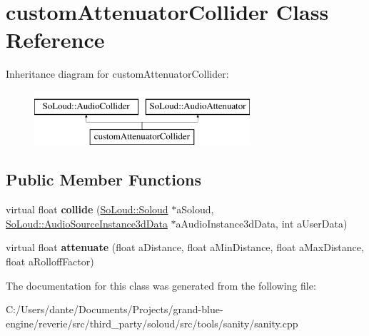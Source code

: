 \hypertarget{classcustom_attenuator_collider}{}\section{custom\+Attenuator\+Collider Class Reference}
\label{classcustom_attenuator_collider}
Inheritance diagram for custom\+Attenuator\+Collider\+:\begin{figure}[H]
\begin{center}
\leavevmode
\includegraphics[height=2.000000cm]{classcustom_attenuator_collider}
\end{center}
\end{figure}
\subsection*{Public Member Functions}
\begin{DoxyCompactItemize}
\item 
\mbox{\label{classcustom_attenuator_collider_a8035430799465ebf56b67676129fc9e5}} 
virtual float {\bfseries collide} (\mbox{\hyperlink{class_so_loud_1_1_soloud}{So\+Loud\+::\+Soloud}} $\ast$a\+Soloud, \mbox{\hyperlink{class_so_loud_1_1_audio_source_instance3d_data}{So\+Loud\+::\+Audio\+Source\+Instance3d\+Data}} $\ast$a\+Audio\+Instance3d\+Data, int a\+User\+Data)
\item 
\mbox{\label{classcustom_attenuator_collider_a2e7c086e6cefb3813c0e1beae1bf02fa}} 
virtual float {\bfseries attenuate} (float a\+Distance, float a\+Min\+Distance, float a\+Max\+Distance, float a\+Rolloff\+Factor)
\end{DoxyCompactItemize}


The documentation for this class was generated from the following file\+:\begin{DoxyCompactItemize}
\item 
C\+:/\+Users/dante/\+Documents/\+Projects/grand-\/blue-\/engine/reverie/src/third\+\_\+party/soloud/src/tools/sanity/sanity.\+cpp\end{DoxyCompactItemize}
